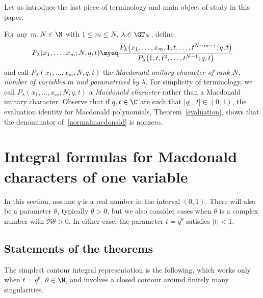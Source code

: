Let us introduce the last piece of terminology and main object of study in this paper.

\begin{df}
For any $m, N\in\N$ with $1\leq m\leq N$, $\lambda\in\GT_N$, def\/ine
\begin{gather}\label{normalmacdonald}
P_{\lambda}(x_1, \dots, x_m; N, q, t) \myeq \frac{P_{\lambda}\big(x_1, \dots, x_m, 1, t, \dots, t^{N-m-1}; q, t\big)}{P_{\lambda}\big(1, t, t^2, \dots, t^{N-1}; q, t\big)}
\end{gather}
and call $P_{\lambda}(x_1, \dots, x_m; N, q, t)$ the \textit{Macdonald unitary character of rank $N$, number of variables $m$ and parametrized by $\lambda$}.
For simplicity of terminology, we call $P_{\lambda}(x_1, \dots, x_m; N, q, t)$ a \textit{Macdonald character} rather than a Macdonald unitary character. Observe that if $q, t \in \C$ are such that $|q|, |t|\in (0, 1)$, the evaluation identity for Macdonald polynomials, Theorem~\ref{evaluation}, shows that the denominator of~\eqref{normalmacdonald} is nonzero.
\end{df}

\section{Integral formulas for Macdonald characters of one variable}\label{macdonaldintegralsec}


In this section, assume $q$ is a real number in the interval $(0, 1)$. There will also be a parameter $\theta$, typically $\theta > 0$, but we also consider cases when $\theta$ is a complex number with $\Re\theta > 0$. In either case, the parameter $t = q^{\theta}$ satisf\/ies $|t| < 1$.


\subsection{Statements of the theorems}


The simplest contour integral representation is the following, which works only when $t = q^{\theta}$, $\theta\in\N$, and involves a closed contour around f\/initely many singularities.


